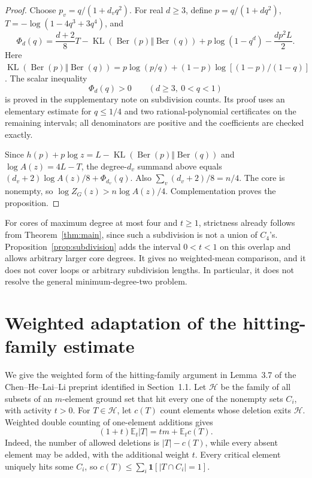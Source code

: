 \documentclass[11pt]{article}
\newcommand{\E}{\mathbb E}\newcommand{\Prob}{\mathbb P}
\newcommand{\ind}{\mathbf1}\newcommand{\F}{\mathcal F}\newcommand{\V}{\mathcal V}
\begin{document}
\begin{proof}
Choose $p_v=q/(1+d_vq^2)$. For real $d\ge3$, define $p=q/(1+dq^2)$,
$T=-\log(1-4q^3+3q^4)$, and
\begin{equation}\label{eq:subdivisiongap}
 \Phi_d(q)=\frac{d+2}{8}T
 -\operatorname{KL}(\operatorname{Ber}(p)\Vert\operatorname{Ber}(q))
 +p\log(1-q^d)-\frac{dp^2L}{2}.
\end{equation}
Here $\operatorname{KL}(\operatorname{Ber}(p)\Vert\operatorname{Ber}(q))
=p\log(p/q)+(1-p)\log[(1-p)/(1-q)]$.
The scalar inequality
\begin{equation}\label{eq:subdivisionpositive}
 \Phi_d(q)>0\qquad(d\ge3,\ 0<q<1)
\end{equation}
is proved in the supplementary note on subdivision counts. Its proof uses
an elementary estimate for $q\le1/4$ and two rational-polynomial
certificates on the remaining intervals; all denominators are positive and
the coefficients are checked exactly.

Since $h(p)+p\log z=L-\operatorname{KL}(\operatorname{Ber}(p)\Vert
\operatorname{Ber}(q))$ and $\log A(z)=4L-T$, the degree-$d_v$ summand
above equals $(d_v+2)\log A(z)/8+\Phi_{d_v}(q)$. Also
$\sum_v(d_v+2)/8=n/4$. The core is nonempty, so
$\log Z_G(z)>n\log A(z)/4$. Complementation proves the proposition.
\end{proof}

For cores of maximum degree at most four and $t\ge1$, strictness already
follows from Theorem~\ref{thm:main}, since such a subdivision is not a union
of $C_4$'s. Proposition~\ref{prop:subdivision} adds the interval $0<t<1$
on this overlap and allows arbitrary larger core degrees. It gives no
weighted-mean comparison, and it does not cover loops or arbitrary
subdivision lengths. In particular, it does not resolve the general
minimum-degree-two problem.

\appendix
\section{Weighted adaptation of the hitting-family estimate}\label{app:prior}
We give the weighted form of the hitting-family argument in Lemma~3.7 of the Chen--He--Lai--Li preprint identified in Section~1.1. Let $\mathcal H$ be the family of all subsets of an $m$-element ground set that hit every one of the nonempty sets $C_i$, with activity $t>0$. For $T\in\mathcal H$, let $c(T)$ count elements whose deletion exits $\mathcal H$. Weighted double counting of one-element additions gives
\[
 (1+t)\E_t|T|=tm+\E_tc(T).
\]
Indeed, the number of allowed deletions is $|T|-c(T)$, while every absent element may be added, with the additional weight $t$. Every critical element uniquely hits some $C_i$, so $c(T)\le\sum_i\ind[|T\cap C_i|=1]$.
\end{document}
